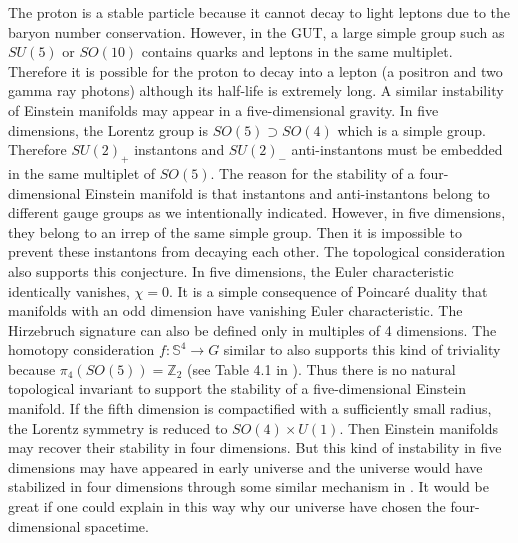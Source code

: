 \documentclass[12pt,epsf]{article}
\begin{document}
The proton is a stable particle because it cannot decay to light leptons
due to the baryon number conservation.
However, in the GUT, a large simple group such as $SU(5)$ or $SO(10)$ contains quarks and leptons
in the same multiplet. Therefore it is possible for the proton to decay into a lepton
(a positron and two gamma ray photons) although its half-life is extremely long.
A similar instability of Einstein manifolds may appear in a five-dimensional gravity.
In five dimensions, the Lorentz group is $SO(5) \supset SO(4)$ which is a simple group.
Therefore $SU(2)_+$ instantons and $SU(2)_-$ anti-instantons must be embedded in the same multiplet
of $SO(5)$. The reason for the stability of a four-dimensional Einstein manifold is that
instantons and anti-instantons belong to different gauge groups as we intentionally indicated.
However, in five dimensions,
they belong to an irrep of the same simple group.
Then it is impossible to prevent these instantons from decaying each other.
The topological consideration also supports this conjecture.
In five dimensions, the Euler characteristic identically vanishes, $\chi = 0$.
It is a simple consequence of Poincar\'e duality that manifolds with an odd dimension
have vanishing Euler characteristic.
The Hirzebruch signature can also be defined only in multiples of 4 dimensions.
The homotopy consideration $f: \mathbb{S}^4 \to G$ similar to  also supports
this kind of triviality because $\pi_4 (SO(5)) = \mathbb{Z}_2$ (see Table 4.1 in \cite{nakahara}).
Thus there is no natural topological invariant to support the stability of a five-dimensional Einstein manifold.
If the fifth dimension is compactified with a sufficiently small radius,
the Lorentz symmetry  is reduced to $SO(4) \times U(1)$.
Then Einstein manifolds may recover their stability in four dimensions.
But this kind of instability in five dimensions may have appeared in early universe
and the universe would have stabilized in four dimensions through some similar mechanism in \cite{kky}.
It would be great if one could explain in this way why our universe have chosen the four-dimensional spacetime.
\end{document}
